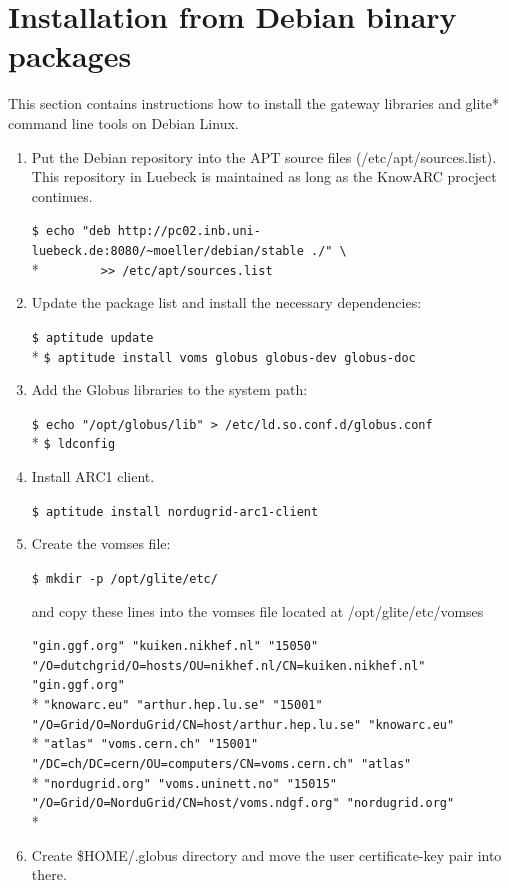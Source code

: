 \documentclass{article}
\begin{document}
\section{Installation from Debian binary packages}
\label{Debian install}
This section contains instructions how to install the gateway libraries and glite* command line tools on Debian Linux.
\begin{enumerate}
\item Put the Debian repository into the APT source files (/etc/apt/sources.list). This repository in Luebeck is maintained as long as the KnowARC procject continues.
\begin{shaded}\verb#$ echo "deb http://pc02.inb.uni-luebeck.de:8080/~moeller/debian/stable ./" \#\\*
\verb#        >> /etc/apt/sources.list #\end{shaded}
\item Update the package list and install the necessary dependencies:
\begin{shaded}\verb#$ aptitude update#\\*
\verb#$ aptitude install voms globus globus-dev globus-doc#\end{shaded}
\item Add the Globus libraries to the system path:
\begin{shaded}\verb#$ echo "/opt/globus/lib" > /etc/ld.so.conf.d/globus.conf#\\*
\verb#$ ldconfig#\end{shaded}
\item Install ARC1 client.
\begin{shaded}\verb#$ aptitude install nordugrid-arc1-client#\end{shaded}
\item Create the vomses file:
\begin{shaded}\verb#$ mkdir -p /opt/glite/etc/#\end{shaded}
and copy these lines into the vomses file located at /opt/glite/etc/vomses
\begin{footnotesize}
\begin{shaded}
\verb#"gin.ggf.org" "kuiken.nikhef.nl" "15050" "/O=dutchgrid/O=hosts/OU=nikhef.nl/CN=kuiken.nikhef.nl" "gin.ggf.org"#\\*
\verb#"knowarc.eu" "arthur.hep.lu.se" "15001" "/O=Grid/O=NorduGrid/CN=host/arthur.hep.lu.se" "knowarc.eu"#\\*
\verb#"atlas" "voms.cern.ch" "15001" "/DC=ch/DC=cern/OU=computers/CN=voms.cern.ch" "atlas"#\\*
\verb#"nordugrid.org" "voms.uninett.no" "15015" "/O=Grid/O=NorduGrid/CN=host/voms.ndgf.org" "nordugrid.org"#\\*
\end{shaded}
\end{footnotesize}
\item Create \$HOME/.globus directory and move the user certificate-key pair into there.
\end{enumerate}

\end{document}
